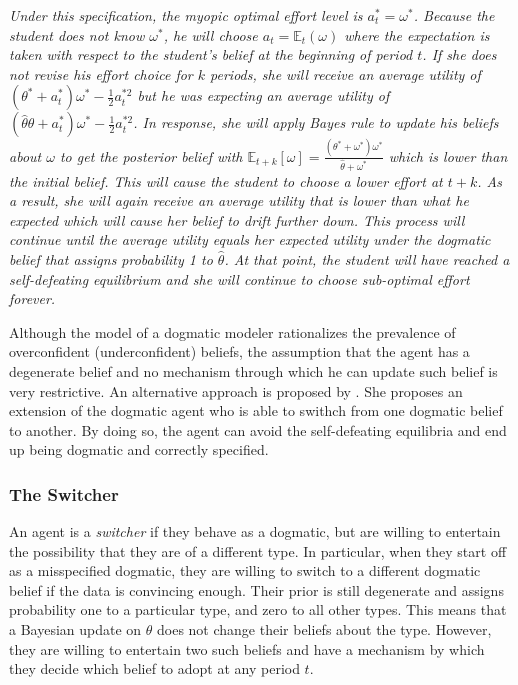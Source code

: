 \documentclass[
  12pt,
]{article}
\begin{document}
\emph{Under this specification, the myopic optimal effort level is
\(a_t^* = \omega^*\). Because the student does not know \(\omega^*\), he
will choose \(a_t = \mathbb{E}_t(\omega)\) where the expectation is
taken with respect to the student's belief at the beginning of period
\(t\). If she does not revise his effort choice for \(k\) periods, she
will receive an average utility of
\((\theta^*+a_t^*)\omega^* - \frac{1}{2}a_t^{*2}\) but he was expecting
an average utility of
\((\hat{\theta}\theta+a_t^*)\omega^* - \frac{1}{2}a_t^{*2}\). In
response, she will apply Bayes rule to update his beliefs about
\(\omega\) to get the posterior belief with
\(\mathbb{E}_{t+k}[\omega] = \frac{(\theta^{*} + \omega^{*})\omega^{*}}{\hat{\theta} + \omega^{*}}\)
which is lower than the initial belief. This will cause the student to
choose a lower effort at \(t+k\). As a result, she will again receive an
average utility that is lower than what he expected which will cause her
belief to drift further down. This process will continue until the
average utility equals her expected utility under the dogmatic belief
that assigns probability 1 to \(\hat{\theta}\). At that point, the
student will have reached a self-defeating equilibrium and she will
continue to choose sub-optimal effort forever. }

Although the model of a dogmatic modeler rationalizes the prevalence of
overconfident (underconfident) beliefs, the assumption that the agent
has a degenerate belief and no mechanism through which he can update
such belief is very restrictive. An alternative approach is proposed by
\citet{Ba2023}. She proposes an extension of the dogmatic agent who is
able to swithch from one dogmatic belief to another. By doing so, the
agent can avoid the self-defeating equilibria and end up being dogmatic
and correctly specified.

\hypertarget{the-switcher}{%
\subsubsection{The Switcher}\label{the-switcher}}

An agent is a \emph{switcher} if they behave as a dogmatic, but are
willing to entertain the possibility that they are of a different type.
In particular, when they start off as a misspecified dogmatic, they are
willing to switch to a different dogmatic belief if the data is
convincing enough. Their prior is still degenerate and assigns
probability one to a particular type, and zero to all other types. This
means that a Bayesian update on \(\theta\) does not change their beliefs
about the type. However, they are willing to entertain two such beliefs
and have a mechanism by which they decide which belief to adopt at any
period \(t\).
\end{document}
